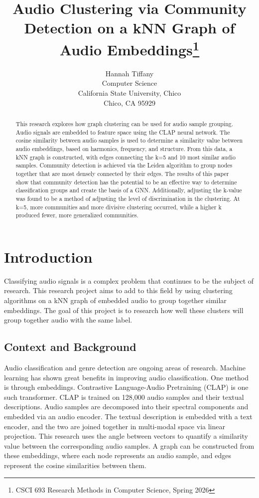 \documentclass{article}
\title{Audio Clustering via Community Detection on a kNN Graph of Audio Embeddings\footnote{CSCI 693 Research Methods in Computer Science, Spring 2026}}
\author{
  Hannah Tiffany\affmark[1]\\
  \affmark[1]Computer Science\\
  California State University, Chico\\
  Chico, CA 95929\\
  \email{\{student,hltiffany\}@csuchico.edu}
}
\begin{document}
\maketitle

\begin{abstract}
  This research explores how graph clustering can be used for audio sample grouping. Audio signals are embedded to feature space using the CLAP neural network. The cosine similarity between audio samples is used to determine a similarity value between audio embeddings, based on harmonics, frequency, and structure. From this data, a kNN graph is constructed, with edges connecting the k=5 and 10 most similar audio samples. Community detection is achieved via the Leiden algorithm to group nodes together that are most densely connected by their edges. The results of this paper show that community detection has the potential to be an effective way to determine classification groups and create the basis of a GNN. Additionally, adjusting the k-value was found to be a method of adjusting the level of discrimination in the clustering. At k=5, more communities and more divisive clustering occurred, while a higher k produced fewer, more generalized communities.
\end{abstract}


\section{Introduction}
Classifying audio signals is a complex problem that continues to be the subject of research. This research project aims to add to this field by using clustering algorithms on a kNN graph of embedded audio to group together similar embeddings. The goal of this project is to research how well these clusters will group together audio with the same label.

\subsection{Context and Background}
Audio classification and genre detection are ongoing areas of research. Machine learning has shown great benefits in improving audio classification. One method is through embeddings. Contrastive Language-Audio Pretraining (CLAP) \cite{elizalde} is one such transformer. CLAP is trained on 128,000 audio samples and their textual descriptions. Audio samples are decomposed into their spectral components and embedded via an audio encoder. The textual description is embedded with a text encoder, and the two are joined together in multi-modal space via linear projection. This research uses the angle between vectors to quantify a similarity value between the corresponding audio samples. A graph can be constructed from these embeddings, where each node represents an audio sample, and edges represent the cosine similarities between them. 
\end{document}
